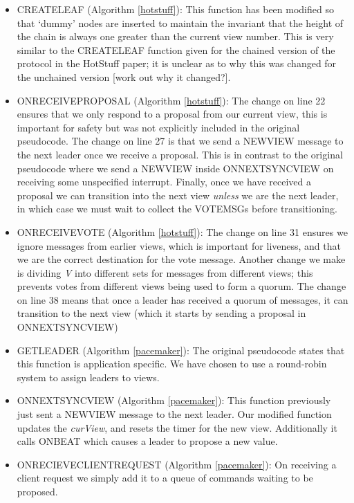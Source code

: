 \begin{itemize}
	\item CREATE{\large L}EAF (Algorithm \ref{hotstuff}): This function has been modified so that `dummy' nodes are inserted to maintain the invariant that the height of the chain is always one greater than the current view number. This is very similar to the CREATE{\large L}EAF function given for the chained version of the protocol in the HotStuff paper; it is unclear as to why this was changed for the unchained version [work out why it changed?].
	\item ON{\large R}ECEIVE{\large P}ROPOSAL (Algorithm \ref{hotstuff}): The change on line 22 ensures that we only respond to a proposal from our current view, this is important for safety but was not explicitly included in the original pseudocode. The change on line 27 is that we send a NEW{\large V}IEW message to the next leader once we receive a proposal. This is in contrast to the original pseudocode where we send a NEW{\large V}IEW inside ON{\large N}EXT{\large S}YNC{\large V}IEW on receiving some unspecified interrupt. Finally, once we have received a proposal we can transition into the next view \textit{unless} we are the next leader, in which case we must wait to collect the VOTE{\large M}SGs before transitioning.
	\item ON{\large R}ECEIVE{\large V}OTE (Algorithm \ref{hotstuff}): The change on line 31 ensures we ignore messages from earlier views, which is important for liveness, and that we are the correct destination for the vote message. Another change we make is dividing \textit{V} into different sets for messages from different views; this prevents votes from different views being used to form a quorum. The change on line 38 means that once a leader has received a quorum of messages, it can transition to the next view (which it starts by sending a proposal in ON{\large N}EXT{\large S}YNC{\large V}IEW)
	\item GET{\large L}EADER (Algorithm \ref{pacemaker}): The original pseudocode states that this function is application specific. We have chosen to use a round-robin system to assign leaders to views.
	\item ON{\large N}EXT{\large S}YNC{\large V}IEW (Algorithm \ref{pacemaker}): This function previously just sent a NEW{\large V}IEW message to the next leader. Our modified function updates the \textit{curView}, and resets the timer for the new view. Additionally it calls ON{\large B}EAT which causes a leader to propose a new value.
	\item ON{\large R}ECIEVE{\large C}LIENT{\large R}EQUEST (Algorithm \ref{pacemaker}): On receiving a client request we simply add it to a queue of commands waiting to be proposed.

\end{itemize}
